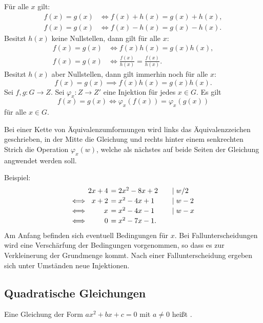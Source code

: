 Für alle $x$ gilt:
\begin{align}
f(x)=g(x) &\Longleftrightarrow f(x){+}h(x)=g(x){+}h(x),\\
f(x)=g(x) &\Longleftrightarrow f(x){-}h(x)=g(x){-}h(x).
\end{align}
Besitzt $h(x)$ keine Nullstellen, dann gilt für alle $x$:
\begin{align}
f(x)=g(x) &\iff f(x)h(x)=g(x)h(x),\\
f(x)=g(x) &\iff \frac{f(x)}{h(x)}=\frac{f(x)}{h(x)}.
\end{align}
Besitzt $h(x)$ aber Nullstellen, dann gilt immerhin noch für alle $x$:
\begin{equation}
f(x)=g(x) \implies f(x)h(x)=g(x)h(x).
\end{equation}
Sei $f,g\colon G\to Z$. Sei $\varphi_x\colon Z\to Z'$ eine Injektion
für jedes $x\in G$. Es gilt
\begin{equation}
f(x)=g(x) \iff \varphi_x(f(x))=\varphi_x(g(x))
\end{equation}
für alle $x\in G$.

Bei einer Kette von Äquivalenzumformungen wird links das
Äquivalenzzeichen geschrieben, in der Mitte die Gleichung
und rechts hinter einem senkrechten Strich die Operation
$\varphi_x(w)$, welche als nächstes auf beide Seiten der Gleichung
angwendet werden soll.

Beispiel:
\begin{equation*}\setlength{\arraycolsep}{2pt}
\begin{array}{rrl@{\qquad}l}
& 2x+4 &= 2x^2-8x+2 &\mid w/2\\[2pt]
\Longleftrightarrow& x+2 &= x^2-4x+1 &\mid w-2\\[2pt]
\Longleftrightarrow& x &= x^2-4x-1 &\mid w-x\\[2pt]
\Longleftrightarrow& 0 &= x^2-7x-1.
\end{array}
\end{equation*}
Am Anfang befinden sich eventuell Bedingungen für $x$.
Bei Fallunterscheidungen wird eine Verschärfung der Bedingungen
vorgenommen, so dass es zur Verkleinerung der Grundmenge kommt.
Nach einer Fallunterscheidung ergeben sich unter Umständen neue
Injektionen.

\subsection{Quadratische Gleichungen}
\begin{definition}
Eine Gleichung der Form $ax^2+bx+c=0$ mit $a\ne 0$ heißt
.
\end{definition}

